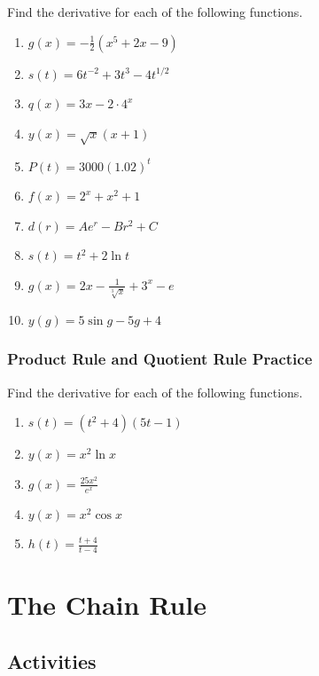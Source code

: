 \documentclass[
]{book}
\providecommand{\tightlist}{%
  \setlength{\itemsep}{0pt}\setlength{\parskip}{0pt}}
\begin{document}
Find the derivative for each of the following functions.

\begin{enumerate}
\def\labelenumi{\arabic{enumi}.}
\tightlist
\item
  \(g(x) = -\frac{1}{2}\left(x^5 +2x -9 \right)\)
\item
  \(s(t) = 6t^{-2} + 3t^3 - 4t^{1/2}\)
\item
  \(q(x) = 3x - 2\cdot 4^x\)
\item
  \(y(x) = \sqrt{x}(x+1)\)
\item
  \(P(t) = 3000(1.02)^t\)
\item
  \(f(x) = 2^x + x^2 + 1\)
\item
  \(d(r) = Ae^{r} - Br^2 + C\)
\item
  \(s(t) = t^2 + 2\ln t\)
\item
  \(g(x) = 2x - \frac{1}{\sqrt[3]{x}} + 3^x - e\)
\item
  \(y(g) = 5\sin g - 5g + 4\)
\end{enumerate}

\hypertarget{product-rule-and-quotient-rule-practice}{%
\subsection{Product Rule and Quotient Rule Practice}\label{product-rule-and-quotient-rule-practice}}

Find the derivative for each of the following functions.

\begin{enumerate}
\def\labelenumi{\arabic{enumi}.}
\tightlist
\item
  \(s(t)=(t^2+4)(5t-1)\)
\item
  \(y(x)=x^2\ln x\)
\item
  \(g(x)= \frac{25x^2}{e^x}\)
\item
  \(y(x)=x^2\cos x\)
\item
  \(h(t)=\frac{t+4}{t-4}\)
\end{enumerate}

\hypertarget{the-chain-rule}{%
\chapter{The Chain Rule}\label{the-chain-rule}}

\hypertarget{activities-15}{%
\section{Activities}\label{activities-15}}
\end{document}
